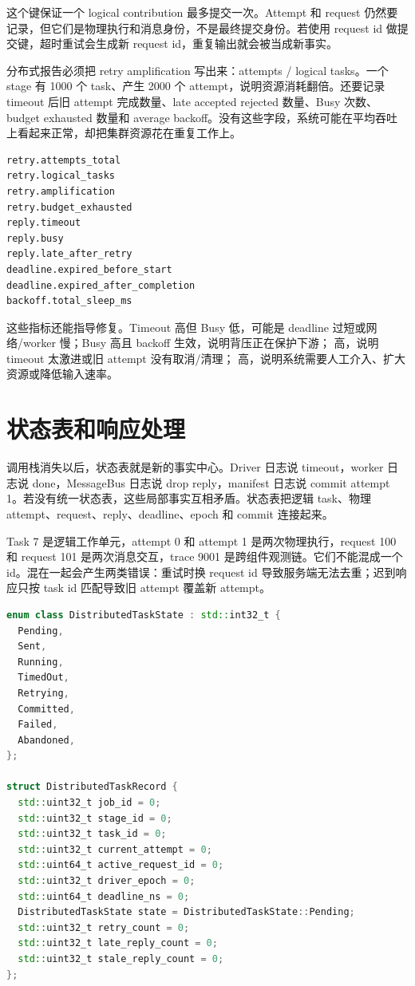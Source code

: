 这个键保证一个 logical contribution 最多提交一次。Attempt 和 request 仍然要记录，但它们是物理执行和消息身份，不是最终提交身份。若使用 request id 做提交键，超时重试会生成新 request id，重复输出就会被当成新事实。

分布式报告必须把 retry amplification 写出来：attempts / logical tasks。一个 stage 有 1000 个 task、产生 2000 个 attempt，说明资源消耗翻倍。还要记录 timeout 后旧 attempt 完成数量、late accepted rejected 数量、Busy 次数、budget exhausted 数量和 average backoff。没有这些字段，系统可能在平均吞吐上看起来正常，却把集群资源花在重复工作上。

\begin{lstlisting}[numbers=none,caption={重试和 deadline 指标}]
retry.attempts_total
retry.logical_tasks
retry.amplification
retry.budget_exhausted
reply.timeout
reply.busy
reply.late_after_retry
deadline.expired_before_start
deadline.expired_after_completion
backoff.total_sleep_ms
\end{lstlisting}

这些指标还能指导修复。Timeout 高但 Busy 低，可能是 deadline 过短或网络/worker 慢；Busy 高且 backoff 生效，说明背压正在保护下游； 高，说明 timeout 太激进或旧 attempt 没有取消/清理； 高，说明系统需要人工介入、扩大资源或降低输入速率。

\section{状态表和响应处理}

调用栈消失以后，状态表就是新的事实中心。Driver 日志说 timeout，worker 日志说 done，MessageBus 日志说 drop reply，manifest 日志说 commit attempt 1。若没有统一状态表，这些局部事实互相矛盾。状态表把逻辑 task、物理 attempt、request、reply、deadline、epoch 和 commit 连接起来。

Task 7 是逻辑工作单元，attempt 0 和 attempt 1 是两次物理执行，request 100 和 request 101 是两次消息交互，trace 9001 是跨组件观测链。它们不能混成一个 id。混在一起会产生两类错误：重试时换 request id 导致服务端无法去重；迟到响应只按 task id 匹配导致旧 attempt 覆盖新 attempt。

\begin{lstlisting}[language=C++,caption={Driver 侧任务状态记录}]
enum class DistributedTaskState : std::int32_t {
  Pending,
  Sent,
  Running,
  TimedOut,
  Retrying,
  Committed,
  Failed,
  Abandoned,
};

struct DistributedTaskRecord {
  std::uint32_t job_id = 0;
  std::uint32_t stage_id = 0;
  std::uint32_t task_id = 0;
  std::uint32_t current_attempt = 0;
  std::uint64_t active_request_id = 0;
  std::uint32_t driver_epoch = 0;
  std::uint64_t deadline_ns = 0;
  DistributedTaskState state = DistributedTaskState::Pending;
  std::uint32_t retry_count = 0;
  std::uint32_t late_reply_count = 0;
  std::uint32_t stale_reply_count = 0;
};
\end{lstlisting}

